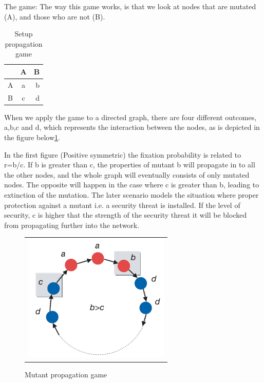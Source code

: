  
The game:
The way this game works, is that we look at nodes that are mutated (A), and those who are not (B).  
\begin{table}[h]
\centering 
\begin{tabular}{ l | c | r }
  
   & A & B \\  \hline  
  A & a & b \\ \hline  
  B & c & d \\
  
\end{tabular}
\caption{\label{fig:gamesetup} Setup propagation game \cite{lieberman2005evolutionary}}
\end{table}

When we apply the game to a directed graph, there are four different outcomes, a,b,c and d, which represents the interaction between the nodes, as is depicted in the figure below\ref{fig:game}. 

In the first figure (Positive symmetric) the fixation probability is related to r=b/c. If b is greater than c, the properties of mutant b will propagate in to all the other nodes, and the whole graph will eventually consists of only mutated nodes. The opposite will happen in the case where c is greater than b, leading to extinction of the mutation. The later scenario models the situation where proper protection against a mutant i.e. a security threat is installed. If the level of security, c is higher that the strength of the security threat it will be blocked from propagating further into the network. 


\begin{figure}
\centering
\begin{tabular}{@{}c@{}}
\includegraphics[width=1.0\textwidth]{natureGameSingle.png}
\end{tabular}
\caption{\label{fig:game} Mutant propagation game}
\end{figure}


